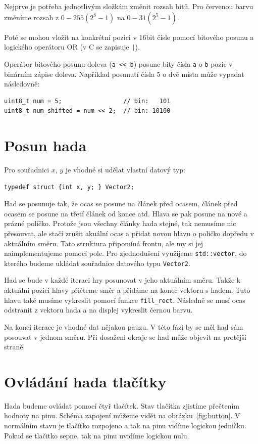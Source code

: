 \documentclass[12pt]{article}
\begin{document}
Nejprve je potřeba jednotlivým složkám změnit rozsah bitů.
Pro červenou barvu změníme rozsah z $0 - 255 (2^8-1)$ na $0 - 31 (2^{5}-1)$.

Poté se mohou vložit na konkrétní pozici v 16bit čísle pomocí bitového posunu a logického operátoru OR (v C se zapisuje \texttt{|}).

Operátor bitového posunu doleva (\texttt{a << b}) posune bity čísla \texttt{a} o \texttt{b} pozic v binárním zápise doleva.
Například posunutí čísla $5$ o dvě místa může vypadat následovně:
\begin{verbatim}
uint8_t num = 5;                 // bin:   101
uint8_t num_shifted = num << 2;  // bin: 10100
\end{verbatim}


\section{Posun hada}
Pro souřadnici $x$, $y$ je vhodné si udělat vlastní datový typ:
\begin{verbatim}
typedef struct {int x, y; } Vector2;
\end{verbatim}

Had se posunuje tak, že ocas se posune na článek před ocasem, článek před ocasem se posune na třetí článek od konce atd.
Hlava se pak posune na nové a prázné políčko.
Protože jsou všechny články hada stejné, tak nemusíme nic přesouvat, ale stačí zrušit akuální ocas a přidat novou hlavu o poličko dopředu v aktuálním směru.
Tato struktura připomíná frontu, ale my si jej naimplementujeme pomocí pole.
Pro zjednodušení využijeme \texttt{std::vector}, do kterého budeme ukládat souřadnice datového typu \texttt{Vector2}.

Had se bude v každé iteraci hry posunovat v jeho aktuálním směru.
Takže k aktuální pozici hlavy přičteme směr a přidáme na konec vektoru s hadem.
Tuto hlavu také musíme vykreslit pomocí funkce \texttt{fill_rect}.
Následně se musí ocas odstranit z vektoru hada a na displej vykreslit černou barvu.

Na konci iterace je vhodné dat nějakou pauzu.
V této fázi by se měl had sám posouvat v jednom směru.
Při dosaženi okraje se had může objevit na protější straně.

\section{Ovládání hada tlačítky}
Hada budeme ovládat pomocí čtyř tlačítek.
Stav tlačítka zjistíme přečtením hodnoty na pinu.
Schéma zapojení můžeme vidět na obrázku~\ref{fig:button}.
V normálním stavu je tlačítko rozpojeno a tak na pinu vidíme logickou jedničku.
Pokud se tlačitko sepne, tak na pinu uvidíme logickou nulu.
\end{document}
